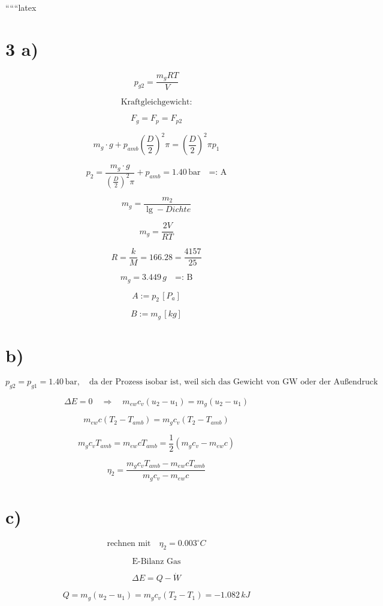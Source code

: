 
``````latex


\section*{3 a)}

\[
p_{g2} = \frac{m_g R T}{V}
\]

\[
\text{Kraftgleichgewicht:}
\]

\[
F_{g} = F_{p} = F_{p2}
\]

\[
m_g \cdot g + p_{amb} \left( \frac{D}{2} \right)^2 \pi = \left( \frac{D}{2} \right)^2 \pi p_1
\]

\[
p_2 = \frac{m_g \cdot g}{\left( \frac{D}{2} \right)^2 \pi} + p_{amb} = 1.40 \, \text{bar} \quad \text{=: A}
\]

\[
m_g = \frac{m_2}{\lg - Dichte}
\]

\[
m_g = \frac{2V}{R T}
\]

\[
R = \frac{k}{M} = 166.28 = \frac{4157}{25}
\]

\[
m_g = 3.449 \, g \quad \text{=: B}
\]

\[
A := p_2 \, [P_a]
\]

\[
B := m_g \, [kg]
\]

\section*{b)}

\[
p_{g2} = p_{g1} = 1.40 \, \text{bar}, \quad \text{da der Prozess isobar ist, weil sich das Gewicht von GW oder der Außendruck nicht geändert hat.}
\]

\[
\Delta E = 0 \quad \Rightarrow \quad m_{ew} c_v (u_2 - u_1) = m_g (u_2 - u_1)
\]

\[
m_{ew} c \left( T_2 - T_{amb} \right) = m_g c_v \left( T_2 - T_{amb} \right)
\]

\[
m_g c_v T_{amb} = m_{ew} c T_{amb} = \frac{1}{2} (m_g c_v - m_{ew} c)
\]

\[
\eta_2 = \frac{m_g c_v T_{amb} - m_{ew} c T_{amb}}{m_g c_v - m_{ew} c}
\]

\section*{c)}

\[
\text{rechnen mit} \quad \eta_2 = 0.003^\circ C
\]

\[
\text{E-Bilanz Gas}
\]

\[
\Delta E = Q - \dot{W}
\]

\[
Q = m_g (u_2 - u_1) = m_g c_v (T_2 - T_1) = -1.082 \, kJ
\]

